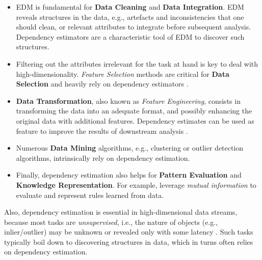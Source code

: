 \begin{itemize}[noitemsep]
	\item \gls{EDM} \cite{DBLP:books/wi/DasuJ03, DBLP:journals/sigkdd/AssentKMS07, DBLP:conf/ieeevast/TatuMFBSSK12} is fundamental for \textbf{Data Cleaning} and \textbf{Data Integration}. \gls{EDM} reveals structures in the data, e.g., artefacts and inconsistencies that one should clean, or relevant attributes to integrate before subsequent analysis. Dependency estimators \cite{DBLP:journals/sigkdd/ParsonsHL04, DBLP:conf/vldb/ZhuS02, DBLP:conf/sigmod/MayfieldNP10} are a characteristic tool of \gls{EDM} to discover such structures.  
	\item Filtering out the attributes irrelevant for the task at hand is key to deal with high-dimensionality. \textit{Feature Selection} \cite{DBLP:journals/jmlr/GuyonE03} methods are critical for \textbf{Data Selection} and heavily rely on dependency estimators \cite{DBLP:journals/pami/PengLD05, DBLP:journals/tkde/HallH03, DBLP:journals/eswa/BennasarHS15, DBLP:journals/pr/LiuSLZ09}. 
	\item \textbf{Data Transformation}, also known as \textit{Feature Engineering}, consists in transforming the data into an adequate format, and possibly enhancing the original data with additional features. Dependency estimates can be used as feature to improve the results of downstream analysis \cite{DBLP:conf/vldb/ZhuS02, DBLP:journals/jmlr/Torkkola03, DBLP:conf/icml/YuanH09, DBLP:conf/eenergy/VollmerETBKB19}. 
	\item Numerous \textbf{Data Mining} algorithms, e.g., clustering \cite{DBLP:conf/sdm/BohmKMNV13, DBLP:conf/bigdataconf/NguyenMB13} or outlier detection \cite{DBLP:conf/icde/KellerMB12, DBLP:journals/ijdsa/TrittenbachB19} algorithms, intrinsically rely on dependency estimation. 
	\item Finally, dependency estimation also helps for \textbf{Pattern Evaluation} and \textbf{Knowledge Representation}. For example, \cite{DBLP:journals/pvldb/GebalyAGKS14, DBLP:journals/debu/GebalyFGKS18, DBLP:conf/ssdbm/VollmerGBS19} leverage \textit{mutual information} to evaluate and represent rules learned from data. 
\end{itemize}
Also, dependency estimation is essential in high-dimensional data streams, because most tasks are \textit{unsupervised}, i.e., the nature of objects (e.g., inlier/outlier) may be unknown or revealed only with some latency \cite{DBLP:journals/cim/DitzlerRAP15}. Such tasks %
typically boil down to discovering structures in data, which in turns often relies on dependency estimation. 

